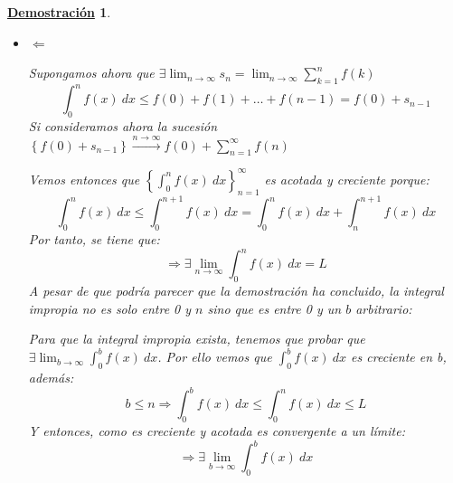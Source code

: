 \documentclass[10pt,a4paper,openright]{book}
\theoremstyle{break}
\newtheorem*{demo}{\underline{Demostración}}
\newcommand{\dif}[1]{\ d#1}
\begin{document}
\begin{demo}
\begin{itemize}

Si ahora suponemos que lo que es convergente es la integral, tenemos que:
$$ \int_{0}^{+\infty} f(x)\dif{x} \mbox{ es convergente } \Rightarrow \exists \lim_{n \to \infty} \int_{0}^{n} f(x)\dif{x} = L$$
De este modo, recuperando la desigualdad de antes vemos que:
$$\underbrace{f(1)+f(2) + \ldots + f(n)}_{s_n} \leq \int_{0}^{n} f(x)\dif{x} \leq  L $$
Por tanto, como $s_n$ es creciente y está acotada superiormente, tenemos que es convergente, es decir:
$$\exists \lim_{n \to \infty} s_n = \sum_{n=1}^{\infty} f(n)$$

\item $\Leftarrow$

Supongamos ahora que $\exists \displaystyle \lim_{n \to \infty} s_n = \lim_{n \to \infty} \sum_{k=1}^{n} f(k)$
$$\int_{0}^{n} f(x)\dif{x} \leq f(0)+f(1) + \ldots + f(n-1) = f(0) + s_{n-1}$$
Si consideramos ahora la sucesión $\left\lbrace f(0) + s_{n-1}\right\rbrace \xrightarrow{n\rightarrow\infty} f(0) + \sum_{n=1}^{\infty} f(n)$

Vemos entonces que $\left\lbrace\displaystyle\int_{0}^{n} f(x) \dif{x}\right\rbrace^\infty_{n=1}$ es acotada y creciente  porque:
$$\int_{0}^{n} f(x)\dif{x} \leq \int_{0}^{n+1} f(x)\dif{x} = \int_{0}^{n} f(x)\dif{x} + \int_{n}^{n+1} f(x)\dif{x}$$
Por tanto, se tiene que:
$$\Rightarrow \exists \lim_{n \to \infty} \int_{0}^{n} f(x) \dif{x} = L$$
A pesar de que podría parecer que la demostración ha concluido, la integral impropia no es solo entre 0 y $n$ sino que es entre 0 y un $b$ arbitrario:

Para que la integral impropia exista, tenemos que probar que $\displaystyle \exists\lim_{b \to \infty} \int_{0}^{b} f(x)\dif{x} $. Por ello vemos que $\displaystyle \int_{0}^{b} f(x) \dif{x}$ es creciente en b, además:
$$b\leq n\Rightarrow \int_{0}^{b} f(x)\dif{x} \leq \int_{0}^{n} f(x)\dif{x} \leq L$$
Y entonces, como es creciente y acotada es convergente a un límite:
$$\Rightarrow \exists \lim_{b \to \infty} \int_{0}^{b} f(x) \dif{x}$$
\end{itemize}
\end{demo}
\end{document}
